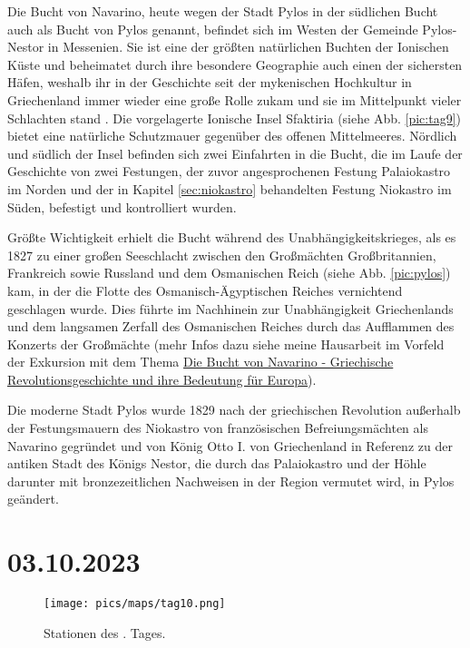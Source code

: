 \documentclass[preprint]{geomorphica} %
\begin{document}
Die Bucht von Navarino, heute wegen der Stadt Pylos in der südlichen Bucht auch als Bucht von Pylos genannt, befindet sich im Westen der Gemeinde Pylos-Nestor in Messenien. Sie ist eine der größten natürlichen Buchten der Ionischen Küste und beheimatet durch ihre besondere Geographie auch einen der sichersten Häfen, weshalb ihr in der Geschichte seit der mykenischen Hochkultur in Griechenland immer wieder eine große Rolle zukam und sie im Mittelpunkt vieler Schlachten stand \cite{Davis2008}. Die vorgelagerte Ionische Insel Sfaktiria (siehe Abb. \ref{pic:tag9}) bietet eine natürliche Schutzmauer gegenüber des offenen Mittelmeeres. Nördlich und südlich der Insel befinden sich zwei Einfahrten in die Bucht, die im Laufe der Geschichte von zwei Festungen, der zuvor angesprochenen Festung Palaiokastro im Norden und der in Kapitel \ref{sec:niokastro} behandelten Festung Niokastro im Süden, befestigt und kontrolliert wurden. 

Größte Wichtigkeit erhielt die Bucht während des Unabhängigkeitskrieges, als es 1827 zu einer großen Seeschlacht zwischen den Großmächten Großbritannien, Frankreich sowie Russland und dem Osmanischen Reich (siehe Abb. \ref{pic:pylos}) kam, in der die Flotte des Osmanisch-Ägyptischen Reiches vernichtend geschlagen wurde. Dies führte im Nachhinein zur Unabhängigkeit Griechenlands und dem langsamen Zerfall des Osmanischen Reiches durch das Aufflammen des Konzerts der Großmächte (mehr Infos dazu siehe meine Hausarbeit im Vorfeld der Exkursion mit dem Thema \hyperlink{ref:ha}{Die Bucht von Navarino - Griechische Revolutionsgeschichte und ihre Bedeutung für Europa}).

Die moderne Stadt Pylos wurde 1829 nach der griechischen Revolution außerhalb der Festungsmauern des Niokastro von französischen Befreiungsmächten als Navarino gegründet und von König Otto I. von Griechenland in Referenz zu der antiken Stadt des Königs Nestor, die durch das Palaiokastro und der Höhle darunter mit bronzezeitlichen Nachweisen in der Region vermutet wird, in Pylos geändert.


\newpage

\section{03.10.2023}

\begin{figure}[!h]
    \centering
    \texttt{[image: pics/maps/tag10.png]}
    \caption{Stationen des \theday. Tages.}
    \label{pic:tag10}
\end{figure}
\end{document}
